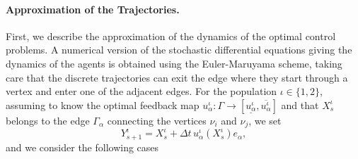 \documentclass[smallextended,referee,envcountsect,]{svjour3}
\begin{document}
\paragraph{Approximation of the Trajectories.}
First, we describe the approximation of the dynamics of the optimal control problems. A numerical version of the stochastic differential equations giving the dynamics of the agents is  obtained using the Euler-Maruyama scheme, taking care   that the discrete trajectories can exit the edge where they start  through a vertex and enter one of the adjacent edges. For the population $\iota\in\{1,2\}$, assuming   to know the optimal feedback map $u^\iota_\alpha:\Gamma\rightarrow [\underline {u^\iota_\alpha}, \overline {u^\iota_\alpha}]$ and that $X^\iota_s$ belongs to the edge $\Gamma_\alpha$ connecting the vertices $\nu_i$ and $\nu_j$, we set  
$$Y^\iota_{s+1}=X^\iota_s+\Delta t \, u^\iota_\alpha(X^\iota_s)e_\alpha,$$
and we consider the following cases
\end{document}
